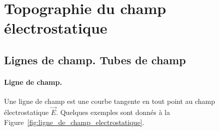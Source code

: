 \section{Topographie du champ électrostatique}

    \subsection{Lignes de champ. Tubes de champ}

        \paragraph{Ligne de champ.}
        Une ligne de champ est une courbe tangente en tout point au champ électrostatique $\vec{E}$. Quelques exemples sont donnés à la Figure~\ref{fig:ligne_de_champ_electrostatique}.

